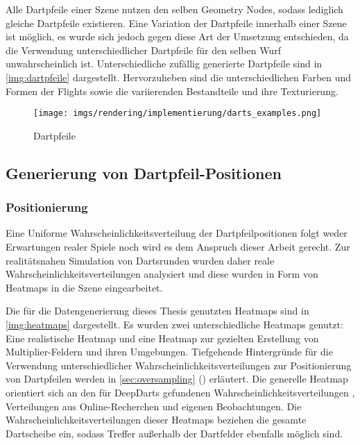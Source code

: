\vspace{\baselineskip}

Alle Dartpfeile einer Szene nutzen den selben Geometry Nodes, sodass lediglich gleiche Dartpfeile existieren. Eine Variation der Dartpfeile innerhalb einer Szene ist möglich, es wurde sich jedoch gegen diese Art der Umsetzung entschieden, da die Verwendung unterschiedlicher Dartpfeile für den selben Wurf unwahrscheinlich ist. Unterschiedliche zufällig generierte Dartpfeile sind in \autoref{img:dartpfeile} dargestellt. Hervorzuheben sind die unterschiedlichen Farben und Formen der Flights sowie die variierenden Bestandteile und ihre Texturierung.

\begin{figure}
    \centering
    \texttt{[image: imgs/rendering/implementierung/darts\_examples.png]}
    \caption{Dartpfeile}
    \label{img:dartpfeile}
\end{figure}

\subsection{Generierung von Dartpfeil-Positionen}  %
\label{sec:wie_dartpfeil_positionen}

\subsubsection{Positionierung}
\label{sec:dartpfeil_positionierung}

Eine Uniforme Wahrscheinlichkeitsverteilung der Dartpfeilpositionen folgt weder Erwartungen realer Spiele noch wird es dem Anspruch dieser Arbeit gerecht. Zur realitätsnahen Simulation von Dartsrunden wurden daher reale Wahrscheinlichkeitsverteilungen analysiert und diese wurden in Form von Heatmaps in die Szene eingearbeitet.

Die für die Datengenerierung dieses Thesis genutzten Heatmaps sind in \autoref{img:heatmaps} dargestellt. Es wurden zwei unterschiedliche Heatmaps genutzt: Eine realistische Heatmap und eine Heatmap zur gezielten Erstellung von Multiplier-Feldern und ihren Umgebungen. Tiefgehende Hintergründe für die Verwendung unterschiedlicher Wahrscheinlichkeitsverteilungen zur Positionierung von Dartpfeilen werden in \autoref{sec:oversampling} () erläutert. Die generelle Heatmap orientiert sich an den für DeepDarts gefundenen Wahrscheinlichkeitsverteilungen \cite{deepdarts}, Verteilungen aus Online-Recherchen \cite{heatmap} und eigenen Beobachtungen. Die Wahrscheinlichkeitsverteilungen dieser Heatmaps beziehen die gesamte Dartscheibe ein, sodass Treffer außerhalb der Dartfelder ebenfalls möglich sind.

